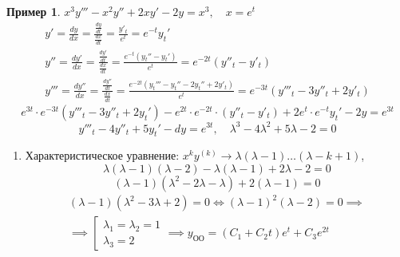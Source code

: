 \documentclass[11pt,a4paper,oneside]{report}
\theoremstyle{definition}
\newtheorem{example}{Пример}
\theoremstyle{plain}
\theoremstyle{remark}
\begin{document}
\begin{example}
    $x^3y''' - x^2 y'' + 2xy' - 2y = x^3, \quad x = e^t$
    \begin{equation*}
        \begin{array}{l}
            y' = \frac{dy}{dx} = \frac{\frac{dy}{dt}}{\frac{dx}{dt}} = \frac{y'_t}{e^t} = e^{-t}y_t'                             \\
            y'' = \frac{dy'}{dx} = \frac{\frac{dy'}{dt}}{\frac{dx}{dt}} = \frac{e^{-t}(y_t''-y_t')}{e^t} = e^{-2t}(y''_t - y'_t) \\
            y''' = \frac{dy''}{dx} = \frac{\frac{dy''}{dt}}{\frac{dx}{dt}} = \frac{e^{-2t}(y_t'''-y_t'' - 2y_t'' + 2y'_t)}{e^t} = e^{-3t}(y'''_t - 3y''_t + 2y'_t)
        \end{array}
    \end{equation*}
    \begin{equation*}
        e^{3t}\cdot e^{-3t}(y'''_t - 3y''_t + 2y_t') - e^{2t}\cdot e^{-2t}\cdot (y''_t - y'_t) + 2e^t \cdot e^{-t}y_t' - 2y = e^{3t}
    \end{equation*}
    \begin{equation*}
        y'''_t - 4y''_t + 5y_t' - dy = e^{3t}, \quad \lambda^3 - 4\lambda^2 + 5\lambda -2 = 0
    \end{equation*}
    \begin{enumerate}
        \item Характеристическое уравнение: $x^ky^{(k)}\rightarrow \lambda(\lambda-1)\ldots(\lambda-k+1)$,
              \begin{equation*}
                  \lambda(\lambda - 1)(\lambda -2) - \lambda(\lambda-1)+ 2\lambda - 2 = 0
              \end{equation*}
              \begin{equation*}
                  (\lambda-1)(\lambda^2 - 2\lambda - \lambda) + 2(\lambda -1) = 0
              \end{equation*}
              \begin{multline*}
                  (\lambda - 1)(\lambda^2 - 3\lambda + 2) = 0 \iff (\lambda - 1)^2(\lambda - 2) = 0 \implies \\
                  \implies \left[\begin{array}{l}
                      \lambda_1 = \lambda_2 = 1 \\
                      \lambda_3 = 2
                  \end{array}\right. \implies y_{\text{ОО}} = (C_1 + C_2t)e^t + C_3 e^{2t}
              \end{multline*}


\end{enumerate}
\end{example}
\end{document}
